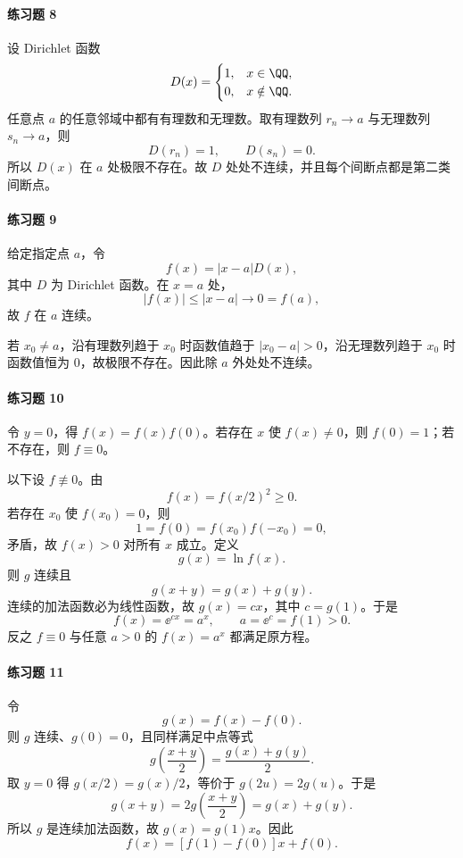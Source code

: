 \paragraph{练习题 8}
\begin{xsolution}
设 Dirichlet 函数
\[
 D(x)=\begin{cases}1,&x\in\QQ,\\0,&x\notin\QQ.
 \end{cases}
\]
任意点 $a$ 的任意邻域中都有有理数和无理数。取有理数列 $r_n\to a$ 与无理数列 $s_n\to a$，则
\[
 D(r_n)=1,\qquad D(s_n)=0.
\]
所以 $D(x)$ 在 $a$ 处极限不存在。故 $D$ 处处不连续，并且每个间断点都是第二类间断点。
\end{xsolution}

\paragraph{练习题 9}
\begin{xsolution}
给定指定点 $a$，令
\[
 f(x)=|x-a|D(x),
\]
其中 $D$ 为 Dirichlet 函数。在 $x=a$ 处，
\[
 |f(x)|\le|x-a|\to0=f(a),
\]
故 $f$ 在 $a$ 连续。

若 $x_0\ne a$，沿有理数列趋于 $x_0$ 时函数值趋于 $|x_0-a|>0$，沿无理数列趋于 $x_0$ 时函数值恒为 $0$，故极限不存在。因此除 $a$ 外处处不连续。
\end{xsolution}

\paragraph{练习题 10}
\begin{xsolution}
令 $y=0$，得 $f(x)=f(x)f(0)$。若存在 $x$ 使 $f(x)\ne0$，则 $f(0)=1$；若不存在，则 $f\equiv0$。

以下设 $f\not\equiv0$。由
\[
 f(x)=f(x/2)^2\ge0.
\]
若存在 $x_0$ 使 $f(x_0)=0$，则
\[
 1=f(0)=f(x_0)f(-x_0)=0,
\]
矛盾，故 $f(x)>0$ 对所有 $x$ 成立。定义
\[
 g(x)=\ln f(x).
\]
则 $g$ 连续且
\[
 g(x+y)=g(x)+g(y).
\]
连续的加法函数必为线性函数，故 $g(x)=cx$，其中 $c=g(1)$。于是
\[
 f(x)=\ee^{cx}=a^x,
 \qquad a=\ee^c=f(1)>0.
\]
反之 $f\equiv0$ 与任意 $a>0$ 的 $f(x)=a^x$ 都满足原方程。
\end{xsolution}

\paragraph{练习题 11}
\begin{xsolution}
令
\[
 g(x)=f(x)-f(0).
\]
则 $g$ 连续、$g(0)=0$，且同样满足中点等式
\[
 g\left(\frac{x+y}{2}\right)=\frac{g(x)+g(y)}2.
\]
取 $y=0$ 得 $g(x/2)=g(x)/2$，等价于 $g(2u)=2g(u)$。于是
\[
 g(x+y)=2g\left(\frac{x+y}{2}\right)=g(x)+g(y).
\]
所以 $g$ 是连续加法函数，故 $g(x)=g(1)x$。因此
\[
 f(x)=[f(1)-f(0)]x+f(0).
\]
\end{xsolution}

